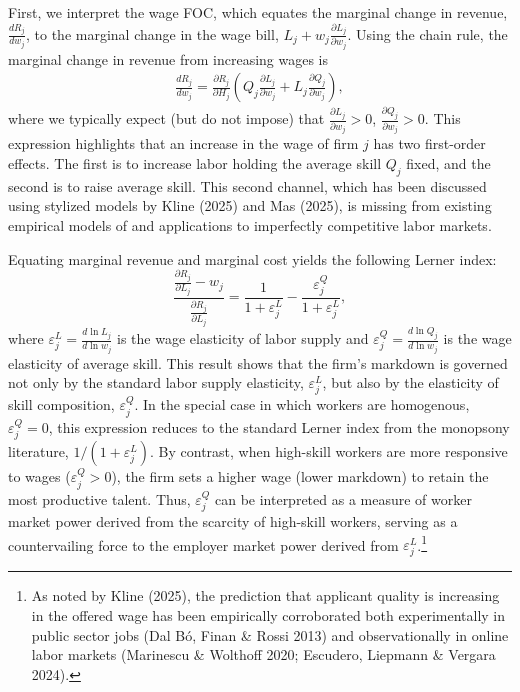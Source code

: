 \documentclass[11pt]{article}
\begin{document}
First, we interpret the wage FOC, which equates the marginal change in revenue, $\frac{dR_j}{dw_j}$, to the marginal change in the wage bill, $L_j + w_j \frac{\partial L_j}{\partial w_j}$. Using the chain rule, the marginal change in revenue from increasing wages is
\begin{eqnarray}
    \frac{dR_j}{dw_j} = \frac{\partial R_j}{\partial H_j}\left(Q_j\frac{\partial L_j}{\partial w_j} + L_j\frac{\partial Q_j}{\partial w_j}\right),
\end{eqnarray}
where we typically expect (but do not impose) that $\frac{\partial L_j}{\partial w_j}>0$, $\frac{\partial Q_j}{\partial w_j}>0$. This expression highlights that an increase in the wage of firm $j$ has two first-order effects. The first is to increase labor holding the average skill $Q_j$ fixed, and the second is to raise average skill. This second channel, which has been discussed using stylized models by Kline (2025) and Mas (2025), is missing from existing empirical models of and applications to imperfectly competitive labor markets.
 

Equating marginal revenue and marginal cost yields the following Lerner index:
\begin{equation}
    \frac{\frac{\partial R_j}{\partial L_j}-w_j}{\frac{\partial R_j}{\partial L_j}}=\frac{1}{1+\varepsilon_j^L} - \frac{ \varepsilon_j^Q}{1+\varepsilon_j^L}, \label{eq:wage_foc}
\end{equation} 
where $\varepsilon_j^L = \frac{d\ln L_j}{d\ln w_j}$ is the wage elasticity of labor supply and $\varepsilon_j^Q = \frac{d\ln Q_j}{d\ln w_j}$ is the wage elasticity of average skill. This result shows that the firm's markdown is governed not only by the standard labor supply elasticity, $\varepsilon_j^L$, but also by the elasticity of skill composition, $\varepsilon_j^Q$. In the special case in which workers are homogenous, $\varepsilon_j^Q=0$, this expression reduces to the standard Lerner index from the monopsony literature, $1/(1+\varepsilon_j^L)$. By contrast, when high-skill workers are more responsive to wages ($\varepsilon_j^Q > 0$), the firm sets a higher wage (lower markdown) to retain the most productive talent. Thus, $\varepsilon_j^Q$ can be interpreted as a measure of worker market power derived from the scarcity of high-skill workers, serving as a countervailing force to the employer market power derived from $\varepsilon_j^L$.\footnote{As noted by Kline (2025), the prediction that applicant quality is increasing in the offered wage has been empirically corroborated both experimentally in public sector jobs (Dal Bó, Finan \& Rossi 2013) and observationally in online labor markets (Marinescu \& Wolthoff 2020; Escudero, Liepmann \& Vergara 2024).}
\end{document}
